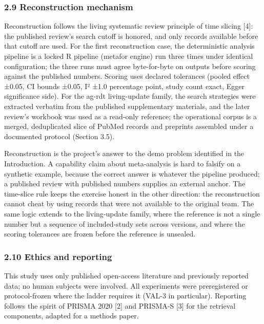 \documentclass[
]{article}
\begin{document}
\subsubsection{2.9 Reconstruction
mechanism}\label{reconstruction-mechanism}

Reconstruction follows the living systematic review principle of time
slicing {[}4{]}: the published review's search cutoff is honored, and
only records available before that cutoff are used. For the first
reconstruction case, the deterministic analysis pipeline is a locked R
pipeline (metafor engine) run three times under identical configuration;
the three runs must agree byte-for-byte on outputs before scoring
against the published numbers. Scoring uses declared tolerances (pooled
effect ±0.05, CI bounds ±0.05, I² ±1.0 percentage point, study count
exact, Egger significance side). For the ag-rdt living-update family,
the search strategies were extracted verbatim from the published
supplementary materials, and the later review's workbook was used as a
read-only reference; the operational corpus is a merged, deduplicated
slice of PubMed records and preprints assembled under a documented
protocol (Section 3.5).

Reconstruction is the project's answer to the demo problem identified in
the Introduction. A capability claim about meta-analysis is hard to
falsify on a synthetic example, because the correct answer is whatever
the pipeline produced; a published review with published numbers
supplies an external anchor. The time-slice rule keeps the exercise
honest in the other direction: the reconstruction cannot cheat by using
records that were not available to the original team. The same logic
extends to the living-update family, where the reference is not a single
number but a sequence of included-study sets across versions, and where
the scoring tolerances are frozen before the reference is unsealed.

\subsubsection{2.10 Ethics and reporting}\label{ethics-and-reporting}

This study uses only published open-access literature and previously
reported data; no human subjects were involved. All experiments were
preregistered or protocol-frozen where the ladder requires it (VAL-3 in
particular). Reporting follows the spirit of PRISMA 2020 {[}2{]} and
PRISMA-S {[}3{]} for the retrieval components, adapted for a methods
paper.
\end{document}
